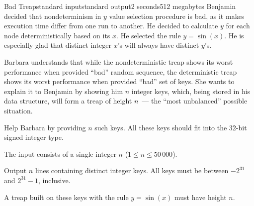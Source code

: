 \begin{problem}{Bad Treap}{standard input}{standard output}{2 seconds}{512 megabytes}
Benjamin decided that nondeterminism in $y$ value selection procedure is bad, as it makes execution time differ from one run to another. He decided to calculate $y$ for each node deterministically based on its $x$. He selected the rule $y = \sin(x)$. He is especially glad that distinct integer $x$'s will always have distinct $y$'s.

Barbara understands that while the nondeterministic treap shows its worst performance when provided ``bad'' random sequence, the deterministic treap shows its worst performance when provided ``bad'' set of keys. She wants to explain it to Benjamin by showing him $n$ integer keys, which, being stored in his data structure, will form a treap of height $n$~--- the ``most unbalanced'' possible situation.

Help Barbara by providing $n$ such keys. All these keys should fit into the 32-bit signed integer type.

\InputFile
The input consists of a single integer $n$ ($1 \le n \le 50\,000$).

\OutputFile
Output $n$ lines containing distinct integer keys. All keys must be between $-2^{31}$ and $2^{31} - 1$, inclusive.

A treap built on these keys with the rule $y = \sin(x)$ must have height $n$.

\Example

\begin{example}
%
\end{example}

\end{problem}

